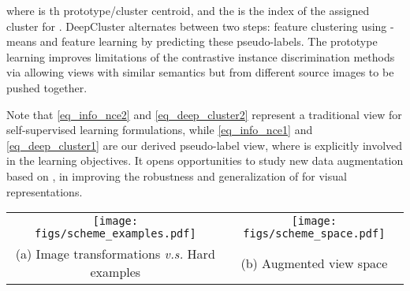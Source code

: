 \documentclass[10pt,twocolumn,letterpaper]{article}
\newcommand{\shortname}{\textsc{Hexa}}
\begin{document}
where  is th prototype/cluster centroid, and the  is the index of the assigned cluster for . DeepCluster alternates between two steps: feature clustering using -means and feature learning by predicting these pseudo-labels.
The prototype learning improves limitations of the contrastive instance discrimination methods via allowing views with similar semantics but from different source images to be pushed together.

Note that \eqref{eq_info_nce2} and \eqref{eq_deep_cluster2} represent a traditional view for self-supervised learning formulations, while \eqref{eq_info_nce1} and \eqref{eq_deep_cluster1} are our derived pseudo-label view, where  is explicitly involved in the learning objectives. It opens opportunities to study new data augmentation  based on , in improving the robustness and generalization of  for visual representations. 

\begin{figure*}[t!]\vspace{-0mm}\centering
	\begin{tabular}{c c}
		\hspace{-4mm}
		\texttt{[image: figs/scheme\_examples.pdf]}  & 
\hspace{-6mm}
		\texttt{[image: figs/scheme\_space.pdf]} \\
		(a) Image transformations {\em v.s.} Hard examples \vspace{2mm} & 
		\hspace{-6mm}
		(b) Augmented view space \hspace{-0mm} \\ 
	\end{tabular}
	\vspace{-3mm}
	\caption{Illustration of \shortname{}: (a) Hard examples. For the original dog image, existing SSP methods employ random transformations to generate augmented example , we propose two types of hard examples. Adversarial examples  add perturbations on  and cut-mixed examples  cut and paste patches between . (b) A visualization example of augmented view space. Each circle ``'' indicates an augmented example . The adversarial example  (``'') fools the model to make a prediction mistake, and the cut-mixed example  (``'') is created between two standard augmentations.
	 }
	\vspace{-3mm}
	\label{fig:hard_example_illustration}
\end{figure*}
\end{document}
